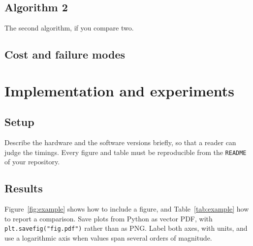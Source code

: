 \documentclass[11pt,a4paper]{article}
\newif\ifshowguide
\theoremstyle{plain}
\theoremstyle{definition}
\theoremstyle{remark}
\newcommand{\guide}[1]{\ifshowguide\par\smallskip\noindent
  \colorbox{gray!12}{\parbox{\dimexpr\linewidth-2\fboxsep}{\small\itshape
  \textbf{Guidance.} #1}}\par\smallskip\fi}
\begin{document}
\subsection{Algorithm 2}

The second algorithm, if you compare two.

\subsection{Cost and failure modes}

\guide{Compare the two algorithms side by side: cost per step, number of
steps, memory, sensitivity to conditioning, and the regime (size,
sparsity, rank) in which each one wins. Section~\ref{sec:experiments}
then checks these predictions.}

\section{Implementation and experiments}
\label{sec:experiments}

\guide{Criterion D. What you implemented yourselves, and what you called
from a library. The data, the benchmark and the metrics. Then the
results: accuracy, the condition numbers of the matrices you actually
factor, runtime against problem size next to the predicted cost, and the
size or condition number at which a method stops working.
\emph{Interim report 2}: a first implementation running on small data
and one comparison with a library routine, with one figure.}

\subsection{Setup}

Describe the hardware and the software versions briefly, so that a
reader can judge the timings. Every figure and table must be
reproducible from the \texttt{README} of your repository.

\subsection{Results}

Figure~\ref{fig:example} shows how to include a figure, and
Table~\ref{tab:example} how to report a comparison. Save plots from
Python as vector PDF, with \texttt{plt.savefig("fig.pdf")} rather than
as PNG. Label both axes, with units, and use a logarithmic axis when
values span several orders of magnitude.
\end{document}
